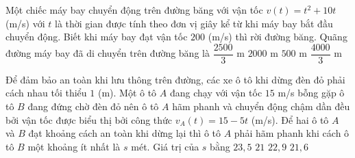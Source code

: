 \begin{ex}%
	Một chiếc máy bay chuyển động trên đường băng với vận tốc $v(t)=t^2+10t$ (m/s) với $t$  là thời gian được tính theo đơn vị giây kể từ khi máy bay bắt đầu chuyển động. Biết khi máy bay đạt vận tốc $200$ (m/s) thì rời đường băng. Quãng đường máy bay đã di chuyển trên đường băng là
	\choice 
		 {\True $\dfrac{2500}{3}$ m}
		{$2000$  m}
		{$500$  m}
		{$\dfrac{4000}{3}$ m} 
\end{ex}

\begin{ex}%
	Để  đảm bảo an toàn khi lưu thông trên đường, các xe ô tô khi dừng đèn đỏ phải cách nhau tối thiểu $1$ (m). Một ô tô $A$ đang chạy với vận tốc $15$ m/s bỗng gặp ô tô $B$ đang đứng chờ đèn đỏ nên ô tô $A$ hãm phanh và chuyển động chậm dần đều bởi vận tốc được biểu thị bởi công thức $v_{A}\left( t \right)=15-5t$ (m/s). Để hai ô tô $A$ và $B$ đạt khoảng cách an toàn khi dừng lại thì ô tô $A$ phải hãm phanh khi cách ô tô $B$ một khoảng ít nhất là $s$ mét. Giá trị của $s$ bằng
	 \choice
		 {\True $23{,}5$}
		 {$21$}
		{$22{,}9$} 
		{$21{,}6$} 
\end{ex}



